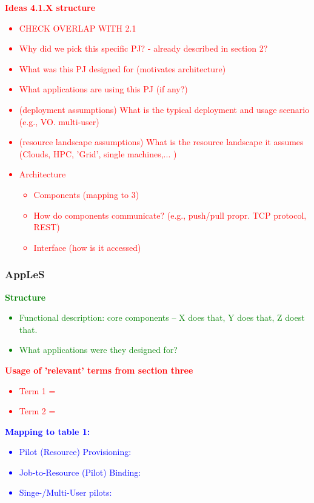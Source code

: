 \documentclass{sig-alternate}
\begin{document}
\textcolor{red}
{
\textbf{Ideas 4.1.X structure}
\begin{itemize}
\item CHECK OVERLAP WITH 2.1
\item Why did we pick this specific PJ? - already described in section 2? 
\item What was this PJ designed for (motivates architecture)
\item What applications are using this PJ (if any?)
\item (deployment assumptions) What is the typical deployment and usage scenario (e.g., VO. multi-user)
\item (resource landscape assumptions) What is the resource landscape it assumes (Clouds, HPC, 'Grid', single machines,... )
\item Architecture
  \begin{itemize}
    \item Components (mapping to 3)
    \item How do components communicate? (e.g., push/pull propr. TCP protocol, REST)
    \item Interface (how is it accessed)
  \end{itemize}
\end{itemize}
}


%
\subsubsection{AppLeS}

\textcolor{green}
{
\textbf{Structure}
\begin{itemize}
\item Functional description: core components -- X does that, Y does that, Z doest that.
\item What applications were they designed for?
\end{itemize}
}

\textcolor{red}
{
\textbf{Usage of 'relevant' terms from section three}
\begin{itemize}
\item Term 1 =
\item Term 2 =
\end{itemize}
}

\textcolor{blue}
{
\textbf{Mapping to table 1:}
\begin{itemize}
\item Pilot (Resource) Provisioning:
\item Job-to-Resource (Pilot) Binding:
\item Singe-/Multi-User pilots:
\end{itemize}
}
\end{document}
